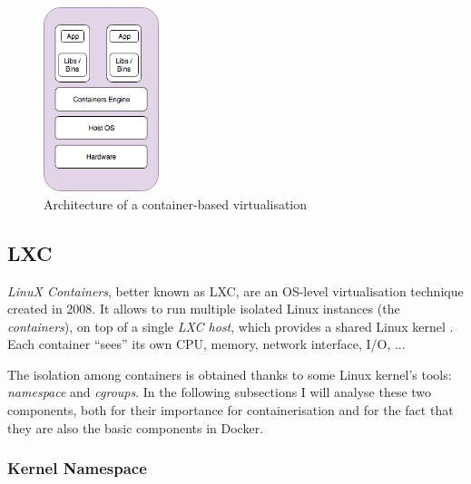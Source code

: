 \documentclass[a4paper,12pt]{article}
\begin{document}
\begin{figure}[ht!]
  \centerline{\includegraphics[width=0.3\textwidth]{container_architecture.png}}
  \caption{Architecture of a container-based virtualisation}
  \label{fig:container_architecture}
  \end{figure}


\subsection{LXC}

\textit{LinuX Containers}, better known as LXC, are an OS-level virtualisation
technique created in 2008. It allows to run multiple isolated Linux instances
(the \textit{containers}), on top of a single \textit{LXC host}, which provides
a shared Linux kernel \cite{wikipedia_LXC}. Each container ``sees'' its own CPU,
memory, network interface, I/O, ... \par The isolation among containers is
obtained thanks to some Linux kernel's tools: \textit{namespace} and
\textit{cgroups}. In the following subsections I will analyse these two
components, both for their importance for containerisation and for the fact that
they are also the basic components in Docker.

\subsubsection{Kernel Namespace}
\end{document}
